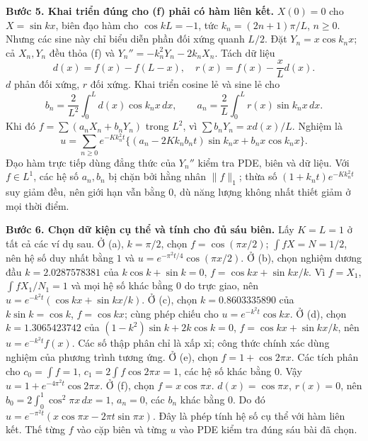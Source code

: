 \documentclass[10pt,a4paper]{article}
\begin{document}
\textbf{Bước 5. Khai triển đúng cho (f) phải có hàm liên kết.}
$X(0)=0$ cho $X=\sin kx$, biên đạo hàm cho $\cos kL=-1$, tức $k_n=(2n+1)\pi/L$, $n\ge0$. Nhưng các sine này chỉ biểu diễn phần đối xứng quanh $L/2$. Đặt $Y_n=x\cos k_nx$; cả $X_n,Y_n$ đều thỏa (f) và $Y_n''=-k_n^2Y_n-2k_nX_n$. Tách dữ liệu
\[d(x)=f(x)-f(L-x),\quad r(x)=f(x)-\frac xL d(x).\]
$d$ phản đối xứng, $r$ đối xứng. Khai triển cosine lẻ và sine lẻ cho
\[b_n=\frac2{L^2}\int_0^Ld(x)\cos k_nx\,dx,\qquad
a_n=\frac2L\int_0^Lr(x)\sin k_nx\,dx.\]
Khi đó $f=\sum(a_nX_n+b_nY_n)$ trong $L^2$, vì $\sum b_nY_n=xd(x)/L$. Nghiệm là
\[u=\sum_{n\ge0}e^{-Kk_n^2t}
\{(a_n-2Kk_nb_nt)\sin k_nx+b_nx\cos k_nx\}.\]
Đạo hàm trực tiếp dùng đẳng thức của $Y_n''$ kiểm tra PDE, biên và dữ liệu. Với $f\in L^1$, các hệ số $a_n,b_n$ bị chặn bởi hằng nhân $\|f\|_1$; thừa số $(1+k_nt)e^{-Kk_n^2t}$ suy giảm đều, nên giới hạn vẫn bằng $0$, dù năng lượng không nhất thiết giảm ở mọi thời điểm.

\textbf{Bước 6. Chọn dữ kiện cụ thể và tính cho đủ sáu biên.}
Lấy $K=L=1$ ở tất cả các ví dụ sau. Ở (a), $k=\pi/2$, chọn $f=\cos(\pi x/2)$; $\int fX=N=1/2$, nên hệ số duy nhất bằng $1$ và $u=e^{-\pi^2t/4}\cos(\pi x/2)$.
Ở (b), chọn nghiệm dương đầu $k=2.0287578381$ của $k\cos k+\sin k=0$, $f=\cos kx+\sin kx/k$. Vì $f=X_1$, $\int fX_1/N_1=1$ và mọi hệ số khác bằng $0$ do trực giao, nên $u=e^{-k^2t}(\cos kx+\sin kx/k)$. Ở (c), chọn $k=0.8603335890$ của $k\sin k=\cos k$, $f=\cos kx$; cùng phép chiếu cho $u=e^{-k^2t}\cos kx$. Ở (d), chọn $k=1.3065423742$ của $(1-k^2)\sin k+2k\cos k=0$, $f=\cos kx+\sin kx/k$, nên $u=e^{-k^2t}f(x)$. Các số thập phân chỉ là xấp xỉ; công thức chính xác dùng nghiệm của phương trình tương ứng.
Ở (e), chọn $f=1+\cos2\pi x$. Các tích phân cho $c_0=\int f=1$, $c_1=2\int f\cos2\pi x=1$, các hệ số khác bằng $0$. Vậy $u=1+e^{-4\pi^2t}\cos2\pi x$.
Ở (f), chọn $f=x\cos\pi x$. $d(x)=\cos\pi x$, $r(x)=0$, nên $b_0=2\int_0^1\cos^2\pi x\,dx=1$, $a_n=0$, các $b_n$ khác bằng $0$. Do đó $u=e^{-\pi^2t}(x\cos\pi x-2\pi t\sin\pi x)$. Đây là phép tính hệ số cụ thể với hàm liên kết. Thế từng $f$ vào cặp biên và từng $u$ vào PDE kiểm tra đúng sáu bài đã chọn.
\end{document}
